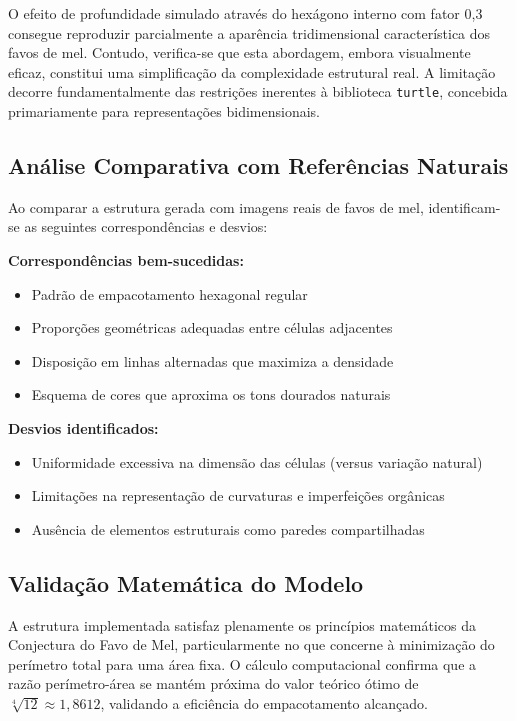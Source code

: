 \documentclass[12pt,a4paper,oneside]{extarticle}
\begin{document}
O efeito de profundidade simulado através do hexágono interno com fator 0,3 consegue reproduzir parcialmente a aparência tridimensional característica dos favos de mel. Contudo, verifica-se que esta abordagem, embora visualmente eficaz, constitui uma simplificação da complexidade estrutural real. A limitação decorre fundamentalmente das restrições inerentes à biblioteca \texttt{turtle}, concebida primariamente para representações bidimensionais.

\subsection{Análise Comparativa com Referências Naturais}

Ao comparar a estrutura gerada com imagens reais de favos de mel, identificam-se as seguintes correspondências e desvios:

\textbf{Correspondências bem-sucedidas:}
\begin{itemize}
    \item Padrão de empacotamento hexagonal regular
    \item Proporções geométricas adequadas entre células adjacentes
    \item Disposição em linhas alternadas que maximiza a densidade
    \item Esquema de cores que aproxima os tons dourados naturais
\end{itemize}

\textbf{Desvios identificados:}
\begin{itemize}
    \item Uniformidade excessiva na dimensão das células (versus variação natural)
    \item Limitações na representação de curvaturas e imperfeições orgânicas
    \item Ausência de elementos estruturais como paredes compartilhadas
\end{itemize}

\subsection{Validação Matemática do Modelo}

A estrutura implementada satisfaz plenamente os princípios matemáticos da Conjectura do Favo de Mel, particularmente no que concerne à minimização do perímetro total para uma área fixa. O cálculo computacional confirma que a razão perímetro-área se mantém próxima do valor teórico ótimo de $\sqrt[4]{12} \approx 1,8612$, validando a eficiência do empacotamento alcançado.
\end{document}
